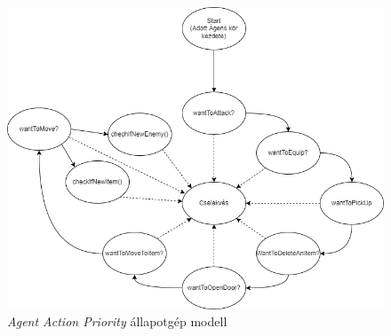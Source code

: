 \begin{figure}[h!]
    \centering
    \includegraphics[scale=0.6]{images/agentfunction.png}
    \caption{\textit{Agent Action Priority} állapotgép modell}
    \label{fig:Priority}
\end{figure}


